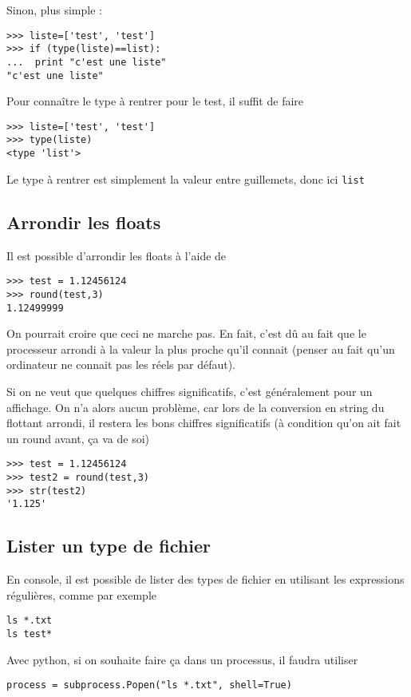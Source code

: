\documentclass[a4paper,twoside]{article}
\begin{document}
Sinon, plus simple :
\begin{verbatim}
>>> liste=['test', 'test']
>>> if (type(liste)==list):
...  print "c'est une liste"
"c'est une liste"
\end{verbatim}

Pour connaître le type à rentrer pour le test, il suffit de faire
\begin{verbatim}
>>> liste=['test', 'test']
>>> type(liste)
<type 'list'>
\end{verbatim}
Le type à rentrer est simplement la valeur entre guillemets, donc ici \texttt{list}

\subsection{Arrondir les floats}
Il est possible d'arrondir les floats à l'aide de
\begin{verbatim}
>>> test = 1.12456124
>>> round(test,3)
1.12499999
\end{verbatim}

On pourrait croire que ceci ne marche pas. En fait, c'est dû au fait que le processeur arrondi à la valeur la plus proche qu'il connait (penser au fait qu'un ordinateur ne connait pas les réels par défaut).

Si on ne veut que quelques chiffres significatifs, c'est généralement pour un affichage. On n'a alors aucun problème, car lors de la conversion en string du flottant arrondi, il restera les bons chiffres significatifs (à condition qu'on ait fait un round avant, ça va de soi)
\begin{verbatim}
>>> test = 1.12456124
>>> test2 = round(test,3)
>>> str(test2)
'1.125'
\end{verbatim}

\subsection{Lister un type de fichier}
En console, il est possible de lister des types de fichier en utilisant les expressions régulières, comme par exemple
\begin{verbatim}
ls *.txt
ls test*
\end{verbatim}

Avec python, si on souhaite faire ça dans un processus, il faudra utiliser
\begin{verbatim}
process = subprocess.Popen("ls *.txt", shell=True)
\end{verbatim}
\end{document}
